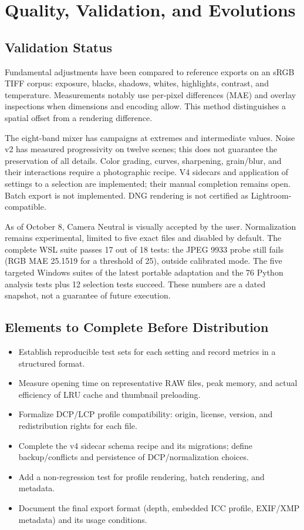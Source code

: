 \chapter{Quality, Validation, and Evolutions}
\label{chap:qualite}

\section{Validation Status}

Fundamental adjustments have been compared to reference exports on an sRGB TIFF corpus: exposure, blacks, shadows, whites, highlights, contrast, and temperature. Measurements notably use per-pixel differences (MAE) and overlay inspections when dimensions and encoding allow. This method distinguishes a spatial offset from a rendering difference.

The eight-band mixer has campaigns at extremes and intermediate values. Noise v2 has measured progressivity on twelve scenes; this does not guarantee the preservation of all details. Color grading, curves, sharpening, grain/blur, and their interactions require a photographic recipe. V4 sidecars and application of settings to a selection are implemented; their manual completion remains open. Batch export is not implemented. DNG rendering is not certified as Lightroom-compatible.

As of October 8, Camera Neutral is visually accepted by the user. Normalization remains experimental, limited to five exact files and disabled by default. The complete WSL suite passes 17 out of 18 tests: the JPEG 9933 probe still fails (RGB MAE 25.1519 for a threshold of 25), outside calibrated mode. The five targeted Windows suites of the latest portable adaptation and the 76 Python analysis tests plus 12 selection tests succeed. These numbers are a dated snapshot, not a guarantee of future execution.

\section{Elements to Complete Before Distribution}

\begin{itemize}
  \item Establish reproducible test sets for each setting and record metrics in a structured format.
  \item Measure opening time on representative RAW files, peak memory, and actual efficiency of LRU cache and thumbnail preloading.
  \item Formalize DCP/LCP profile compatibility: origin, license, version, and redistribution rights for each file.
  \item Complete the v4 sidecar schema recipe and its migrations; define backup/conflicts and persistence of DCP/normalization choices.
  \item Add a non-regression test for profile rendering, batch rendering, and metadata.
  \item Document the final export format (depth, embedded ICC profile, EXIF/XMP metadata) and its usage conditions.
\end{itemize}

